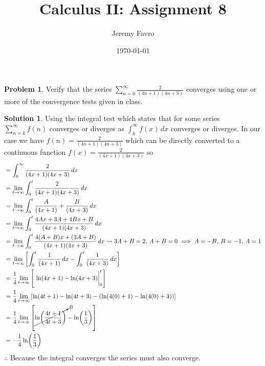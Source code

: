 \documentclass[10pt]{article}
\title{Calculus II: Assignment 8}
\author{Jeremy Favro}
\date{\today}
\theoremstyle{definition}
\newtheorem{problem}{Problem}
\newtheorem{soln}{Solution}
\begin{document}
\maketitle

\begin{problem}
Verify that the series $\sum_{n = 0}^{\infty} \frac{2}{(4n + 1)(4n + 3)}$ converges using one or more of the convergence tests given in class.
\end{problem}
\begin{soln} Using the integral test which states that for some series $\sum_{n = k}^{\infty} f(n)$ converges or diverges as $\int_{k}^{\infty} f(x) \,dx$ converges or diverges.
    In our case we have $f(n)=\frac{2}{(4n + 1)(4n + 3)}$ which can be directly converted to a continuous function $f(x)=\frac{2}{(4x + 1)(4x + 3)}$ so
    \begin{align*}
         & = \int_{0}^{\infty} \frac{2}{(4x + 1)(4x + 3)} \,dx                                                                                              \\
         & = \lim_{t \to \infty} \int_{0}^{t} \frac{2}{(4x + 1)(4x + 3)} \,dx                                                                               \\
         & = \lim_{t \to \infty} \int_{0}^{t} \frac{A}{(4x + 1)}+\frac{B}{(4x + 3)} \,dx                                                                    \\
         & = \lim_{t \to \infty} \int_{0}^{t} \frac{4Ax+3A+4Bx+B}{(4x + 1)(4x + 3)} \,dx                                                                    \\
         & = \lim_{t \to \infty} \int_{0}^{t} \frac{4(A+B)x+(3A+B)}{(4x + 1)(4x + 3)} \,dx \rightsquigarrow 3A+B=2, \, A+B=0 \implies A=-B, \, B=-1, \, A=1 \\
         & = \lim_{t \to \infty} \left[ \int_{0}^{t} \frac{1}{(4x + 1)} \,dx - \int_{0}^{t} \frac{1}{(4x + 3)} \,dx \right]                                 \\
         & = \frac{1}{4}\lim_{t \to \infty} \left[ \eval*{\ln(4x+1) - \ln(4x+3)}_{0}^{t} \right]                                                            \\
         & = \frac{1}{4}\lim_{t \to \infty} \left[ \ln(4t+1) - \ln(4t+3) - (\ln(4(0)+1) - \ln(4(0)+3)) \right]                                              \\
         & = \frac{1}{4}\lim_{t \to \infty} \left[ \cancelto{0}{\ln(\frac{4t+1}{4t+3})} - \ln(\frac{1}{3}) \right]                                          \\
         & =  - \frac{1}{4}\ln(\frac{1}{3})                                                                                                                 \\
    \end{align*}
    $\therefore$ Because the integral converges the series must also converge.
\end{soln}
\end{document}
